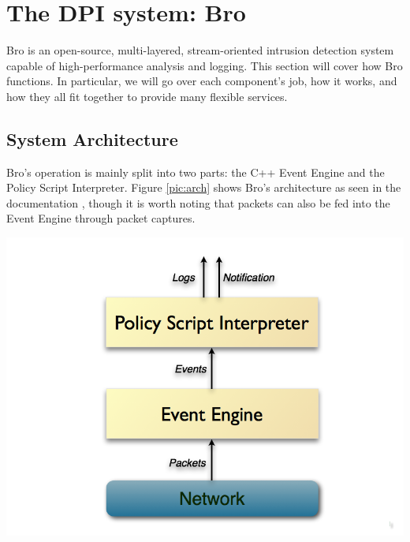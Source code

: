 

\chapter{The DPI system: Bro} \label{chap:bro}
Bro is an open-source, multi-layered, stream-oriented intrusion detection system capable of high-performance analysis and logging. This section will cover how Bro functions. In particular, we will go over each component's job, how it works, and how they all fit together to provide many flexible services.

\section{System Architecture}
Bro's operation is mainly split into two parts: the C++ Event Engine  and the Policy Script Interpreter. Figure \ref{pic:arch} shows Bro's architecture as seen in the documentation \cite{bro}, though it is worth noting that packets can also be fed into the Event Engine through packet captures. \\


\begin{minipage}[c]{\textwidth}
\centering
\includegraphics[scale=0.3]{Figures/architecture.png}
\label{pic:arch}
\end{minipage} \\



